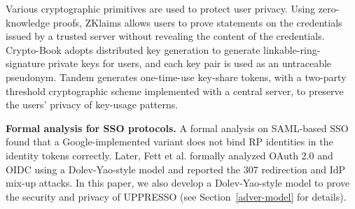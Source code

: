 
Various cryptographic primitives are used to protect user privacy.
Using zero-knowledge proofs,
ZKlaims \cite{zklaim} allows users to prove statements on the credentials issued by a trusted server without revealing the content of the credentials.
Crypto-Book \cite{crypto-book} adopts distributed key generation to generate linkable-ring-signature private keys for users,
    and each key pair is used as an untraceable pseudonym.
Tandem \cite{tandem} generates one-time-use key-share tokens,
    with a two-party threshold cryptographic scheme implemented with a central server,
to preserve the users' privacy of key-usage patterns.



\noindent\textbf{Formal analysis for SSO protocols.}
A formal analysis on SAML-based SSO \cite{ArmandoCCCT08} found that a Google-implemented variant does not bind RP identities in the identity tokens correctly.
Later, Fett et al. \cite{FettKS16, FettKS17} formally analyzed OAuth 2.0 and OIDC using a Dolev-Yao-style model \cite{FettKS14} and reported the 307 redirection and IdP mix-up attacks.
In this paper, we also develop a Dolev-Yao-style model to prove the security and privacy of UPPRESSO (see Section~\ref{adver-model} for details).


